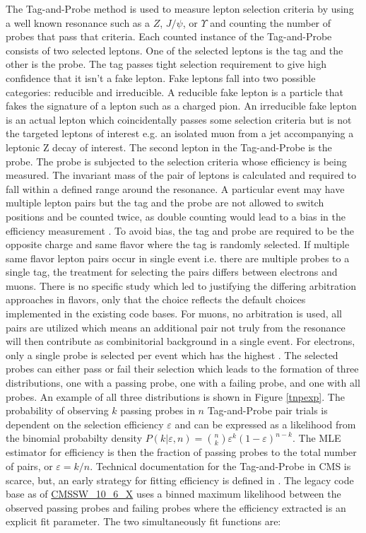 The Tag-and-Probe method is used to measure lepton selection criteria by using a well known resonance such as a $Z$, $J/\psi$, or $\Upsilon$ and counting the number of probes that pass that criteria. Each counted instance of the Tag-and-Probe consists of two selected leptons. One of the selected leptons is the tag and the other is the probe.  The tag passes tight selection requirement to give high confidence that it isn't a fake lepton. Fake leptons fall into two possible categories: reducible and irreducible. A reducible fake lepton is a particle that fakes the signature of a lepton such as a charged pion. An irreducible fake lepton is an actual lepton which coincidentally passes some selection criteria but is not the targeted leptons of interest e.g. an isolated muon from a jet accompanying a leptonic Z decay of interest.  The  second lepton in the Tag-and-Probe is the probe. The probe is subjected to the selection criteria whose efficiency is being measured. The invariant mass of the pair of leptons is calculated and required to fall within a defined range around the resonance. A particular event may have multiple lepton pairs but the tag and the probe are not allowed to switch positions and be counted twice, as double counting would lead to a bias in the efficiency measurement \cite{AN111-2009}. To avoid bias, the tag and probe are required to be the opposite charge and same flavor where the tag is randomly selected. If multiple same flavor lepton pairs occur in single event i.e. there are multiple probes to a single tag, the treatment for selecting the pairs differs between electrons and muons. There is no specific study which led to justifying the differing arbitration approaches in flavors, only that the choice reflects the default choices implemented in the existing code bases.  For muons, no arbitration is used, all pairs are utilized which means an additional pair not truly from the resonance will then contribute as combinitorial background in a single event. For electrons, only a single probe is selected per event which has the highest \pt. The selected probes can either pass or fail their selection which leads to the formation of three distributions, one with a passing probe, one with a failing probe, and one with all probes. An example of all three distributions is shown in Figure \ref{tnpexp}.  The probability of observing $k$ passing probes in $n$ Tag-and-Probe pair trials is dependent on the selection efficiency $\varepsilon$ and can be expressed as a likelihood from the binomial probabilty density $P(k|\varepsilon,n) = \binom{n}{k}\varepsilon^k(1-\varepsilon)^{n-k}$. The MLE estimator for efficiency is then the fraction of passing probes to the total number of pairs, or $\varepsilon = k/n$. Technical documentation for the Tag-and-Probe in CMS is scarce, but, an early strategy for fitting efficiency is defined in \cite{Berryhill_2010}. The legacy code base as of \url{CMSSW_10_6_X}  uses a binned maximum likelihood between the observed passing probes and failing probes where the efficiency extracted is an explicit fit parameter. The two simultaneously fit functions are:
